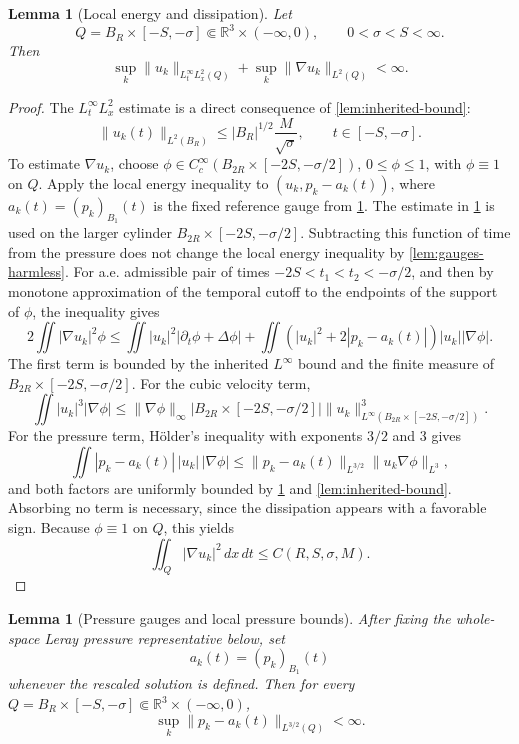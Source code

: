 \documentclass[11pt]{amsart}
\theoremstyle{plain}
\newtheorem{lemma}[theorem]{Lemma}
\theoremstyle{definition}
\theoremstyle{remark}
\numberwithin{equation}{section}
\newcommand{\R}{\mathbb R}
\begin{document}
\begin{lemma}[Local energy and dissipation]\label{lem:energy-diss}
Let
\[
   Q=B_R\times[-S,-\sigma]\Subset \R^3\times(-\infty,0),
   \qquad 0<\sigma<S<\infty.
\]
Then
\[
   \sup_k\|u_k\|_{L^\infty_tL^2_x(Q)}
   +\sup_k\|\nabla u_k\|_{L^2(Q)}
   <\infty .
\]
\end{lemma}

\begin{proof}
The \(L^\infty_tL^2_x\) estimate is a direct consequence of
\cref{lem:inherited-bound}:
\[
   \|u_k(t)\|_{L^2(B_R)}
   \le |B_R|^{1/2}\frac{M}{\sqrt{\sigma}},
   \qquad t\in[-S,-\sigma].
\]
To estimate \(\nabla u_k\), choose
\(\phi\in C_c^\infty(B_{2R}\times[-2S,-\sigma/2])\), \(0\le\phi\le1\),
with \(\phi\equiv1\) on \(Q\).  Apply the local energy inequality to
\((u_k,p_k-a_k(t))\), where \(a_k(t)=(p_k)_{B_1}(t)\) is the fixed reference
gauge from \cref{lem:pressure}.  The estimate in \cref{lem:pressure} is used
on the larger cylinder \(B_{2R}\times[-2S,-\sigma/2]\).  Subtracting this
function of time from the pressure does not change the local energy inequality
by \cref{lem:gauges-harmless}.  For a.e. admissible pair of times
\(-2S<t_1<t_2<-\sigma/2\), and then by monotone approximation of the temporal
cutoff to the endpoints of the support of \(\phi\), the inequality gives
\[
   2\iint |\nabla u_k|^2\phi
   \le
   \iint |u_k|^2|\partial_t\phi+\Delta\phi|
   +\iint (|u_k|^2+2|p_k-a_k(t)|)|u_k||\nabla\phi|.
\]
The first term is bounded by the inherited \(L^\infty\) bound and the finite
measure of \(B_{2R}\times[-2S,-\sigma/2]\).  For the cubic velocity term,
\[
   \iint |u_k|^3|\nabla\phi|
   \le
   \|\nabla\phi\|_\infty
   |B_{2R}\times[-2S,-\sigma/2]|
   \|u_k\|_{L^\infty(B_{2R}\times[-2S,-\sigma/2])}^3 .
\]
For the pressure term, Hölder's inequality with exponents \(3/2\) and \(3\)
gives
\[
   \iint |p_k-a_k(t)|\,|u_k|\,|\nabla\phi|
   \le
   \|p_k-a_k(t)\|_{L^{3/2}}
   \|u_k\nabla\phi\|_{L^3},
\]
and both factors are uniformly bounded by \cref{lem:pressure} and
\cref{lem:inherited-bound}.  Absorbing no term is necessary, since the
dissipation appears with a favorable sign.  Because \(\phi\equiv1\) on \(Q\),
this yields
\[
   \iint_Q|\nabla u_k|^2\,dx\,dt\le C(R,S,\sigma,M).
\]
\end{proof}

\begin{lemma}[Pressure gauges and local pressure bounds]\label{lem:pressure}
After fixing the whole-space Leray pressure representative below, set
\[
   a_k(t)=(p_k)_{B_1}(t)
\]
whenever the rescaled solution is defined.  Then for every
\(Q=B_R\times[-S,-\sigma]\Subset\R^3\times(-\infty,0)\),
\[
   \sup_k\|p_k-a_k(t)\|_{L^{3/2}(Q)}<\infty.
\]
\end{lemma}
\end{document}
